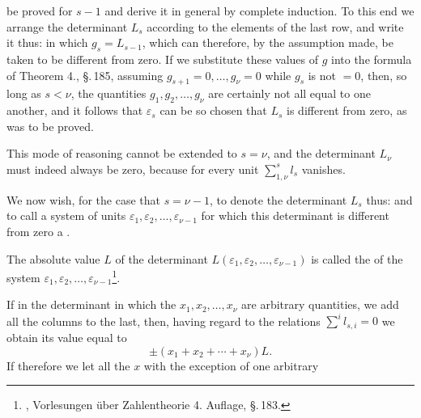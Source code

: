 be proved for $s - 1$ and derive it in general by complete induction. To this end we arrange the determinant $L_s$ according to the elements of the last row, and write it thus:
in which $g_s = L_{s-1}$, which can therefore, by the assumption made, be taken to be different from zero. If we substitute these values of $g$ into the formula of Theorem 4., \S.\,185, assuming $g_{s+1} = 0, \ldots, g_\nu = 0$ while $g_s$ is not $= 0$, then, so long as $s < \nu$, the quantities $g_1, g_2, \ldots, g_\nu$ are certainly not all equal to one another, and it follows that $\varepsilon_s$ can be so chosen that $L_s$ is different from zero, as was to be proved.

This mode of reasoning cannot be extended to $s = \nu$, and the determinant $L_\nu$ must indeed always be zero, because for every unit $\sum\limits_{1,\nu}^{s} l_s$ vanishes.

We now wish, for the case that $s = \nu - 1$, to denote the determinant $L_s$ thus:
and to call a system of units $\varepsilon_1, \varepsilon_2, \ldots, \varepsilon_{\nu-1}$ for which this determinant is different from zero a .

The absolute value $L$ of the determinant $L(\varepsilon_1, \varepsilon_2, \ldots, \varepsilon_{\nu-1})$ is called the  of the system $\varepsilon_1, \varepsilon_2, \ldots, \varepsilon_{\nu-1}$\footnote{, Vorlesungen \"uber Zahlentheorie 4. Auflage, \S.\,183.}.

If in the determinant
in which the $x_1, x_2, \ldots, x_\nu$ are arbitrary quantities, we add all the columns to the last, then, having regard to the relations $\sum\limits^{i} l_{s,i} = 0$
we obtain its value equal to
\[
\pm (x_1 + x_2 + \cdots + x_\nu) L.
\]
If therefore we let all the $x$ with the exception of one arbitrary
